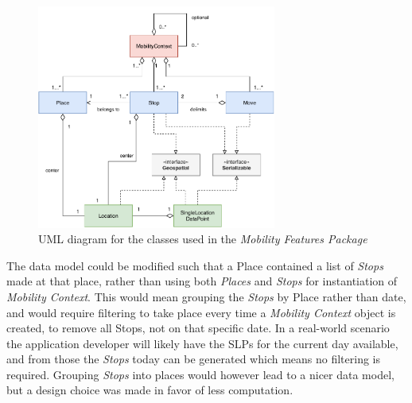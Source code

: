 \begin{figure}[h]
    \centering
    \includegraphics[width=0.7\textwidth]{images/diagrams/uml.pdf}
    \caption{UML diagram for the classes used in the \textit{Mobility Features Package}}
    \label{fig:my_label}
\end{figure}

The data model could be modified such that a Place contained a list of \textit{Stops} made at that place, rather than using both \textit{Places} and \textit{Stops} for instantiation of \textit{Mobility Context}. This would mean grouping the \textit{Stops} by Place rather than date, and would require filtering to take place every time a \textit{Mobility Context} object is created, to remove all Stops, not on that specific date. In a real-world scenario the application developer will likely have the SLPs for the current day available, and from those the \textit{Stops} today can be generated which means no filtering is required. Grouping \textit{Stops} into places would however lead to a nicer data model, but a design choice was made in favor of less computation. 


